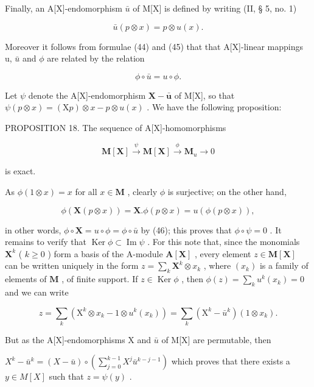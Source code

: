Finally, an A{[}X{]}-endomorphism \(\bar{u}\) of M{[}X{]} is defined by writing (II, § 5, no. 1)

\[
\bar {u} (p \otimes x) = p \otimes u (x).\tag{45}
\]

Moreover it follows from formulae (44) and (45) that that A{[}X{]}-linear mappings u, \(\bar{u}\) and \(\phi\) are related by the relation

\[
\phi \circ \bar {u} = u \circ \phi .\tag{46}
\]

Let \(\psi\) denote the A{[}X{]}-endomorphism \(\mathbf{X} - \bar{\boldsymbol{u}}\) of M{[}X{]}, so that \(\psi(p \otimes x) = (\mathrm{X}p) \otimes x - p \otimes u(x)\) . We have the following proposition:

PROPOSITION 18. The sequence of A{[}X{]}-homomorphisms

\[
\mathbf {M} [ \mathbf {X} ] \stackrel {\psi} {\longrightarrow} \mathbf {M} [ \mathbf {X} ] \stackrel {\phi} {\longrightarrow} \mathbf {M} _ {u} \longrightarrow 0\tag{47}
\]

is exact.

As \(\phi(1 \otimes x) = x\) for all \(x \in \mathbf{M}\) , clearly \(\phi\) is surjective; on the other hand,

\[
\phi (\mathbf {X} (p \otimes x)) = \mathbf {X}. \phi (p \otimes x) = u (\phi (p \otimes x)),
\]

in other words, \(\phi \circ \mathbf{X} = u \circ \phi = \phi \circ \bar{u}\) by (46); this proves that \(\phi \circ \psi = 0\) . It remains to verify that \(\operatorname{Ker} \phi \subset \operatorname{Im} \psi\) . For this note that, since the monomials \(\mathbf{X}^k\) ( \(k \geqslant 0\) ) form a basis of the A-module \(\mathbf{A}[\mathbf{X}]\) , every element \(z \in \mathbf{M}[\mathbf{X}]\) can be written uniquely in the form \(z = \sum_k \mathbf{X}^k \otimes x_k\) , where \((x_k)\) is a family of elements of \(\mathbf{M}\) , of finite support. If \(z \in \operatorname{Ker} \phi\) , then \(\phi(z) = \sum_k u^k(x_k) = 0\) and we can write

\[
z = \sum_ {k} \left(\mathrm{X} ^ {k} \otimes x _ {k} - 1 \otimes u ^ {k} (x _ {k})\right) = \sum_ {k} \left(\mathrm{X} ^ {k} - \bar {u} ^ {k}\right) (1 \otimes x _ {k}).
\]

But as the A{[}X{]}-endomorphisms X and \(\bar{u}\) of M{[}X{]} are permutable, then

\(X^{k}-\bar{u}^{k}=(X-\bar{u})\circ\left(\sum_{j=0}^{k-1}X^{j}\bar{u}^{k-j-1}\right)\) which proves that there exists a \(y\in M[X]\) such that \(z=\psi(y)\) .

